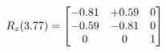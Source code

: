 \documentclass[preview]{standalone}
\begin{document}
\begin{align*}
\special{dvisvgm:raw <g id='unique000'>}R_{z}(3.77) = \begin{bmatrix}-0.81 & +0.59 & 0 \\-0.59 & -0.81 & 0 \\0 & 0 & 1\end{bmatrix}\special{dvisvgm:raw </g>}
\end{align*}
\end{document}
